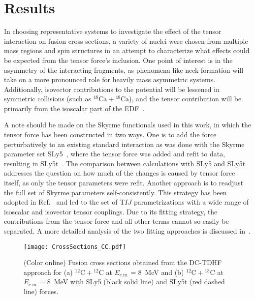 \documentclass[aps,prc,twocolumn,showpacs,superscriptaddress,longbibliography,floatfix,10pt]{revtex4-1}
\begin{document}
\section{Results}
\label{results}


In choosing representative systems to investigate the effect of the tensor interaction on fusion cross sections, a variety of nuclei were chosen from multiple mass regions and spin structures in an attempt to characterize what effects could be expected from the tensor force's inclusion.
One point of interest is in the asymmetry of the interacting fragments, as phenomena like neck formation will take on a more pronounced role for heavily mass asymmetric systems.
Additionally, isovector contributions to the potential will be lessened in symmetric collisions (such as $^{48}\mathrm{Ca}+\mathrm{^{48}Ca}$), and the tensor contribution will be primarily from the isoscalar part of the EDF~\cite{godbey2017}.

A note should be made on the Skyrme functionals used in this work, in which the tensor force has been constructed in two ways.
One is to add the force perturbatively to an existing standard interaction as was done with the Skyrme parameter set SLy5~\cite{chabanat1998a}, where the tensor force was added and refit to data, resulting in SLy5t~\cite{colo2007}.
The comparison between calculations with SLy5 and SLy5t addresses the question on how much of the changes is caused by tensor force itself, as only the tensor parameters were refit.
Another approach is to readjust the full set of Skyrme parameters self-consistently.
This strategy has been adopted in Ref.~\cite{lesinski2007} and led to the set of T$IJ$ parametrizations with a wide range of isoscalar and isovector tensor couplings.
Due to its fitting strategy, the contributions from the tensor force and all other terms cannot so easily be separated.
A more detailed analysis of the two fitting approaches is discussed in~\cite{stevenson2019}.

\begin{figure}
	\texttt{[image: CrossSections\_CC.pdf]}
	\caption{(Color online) Fusion cross sections obtained from the DC-TDHF approach for (a) $^{12}\mathrm{C}+\mathrm{^{12}C}$ at $E_{\mathrm{c.m.}}=8$~MeV and (b) $^{12}\mathrm{C}+\mathrm{^{13}C}$ at $E_{\mathrm{c.m.}}=8$~MeV with SLy5 (black solid line) and SLy5t (red dashed line) forces.
		\label{Fig:CCxsec}}
\end{figure}
\end{document}
